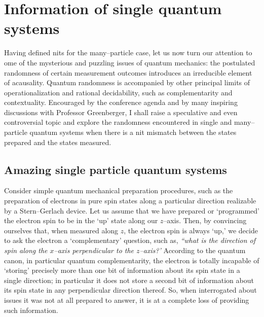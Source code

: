 \documentclass{article}
\begin{document}

\section{Information of single quantum systems}

Having defined nits for the many--particle case,
let us now turn our attention to ome of the
mysterious and puzzling issues of quantum mechanics:
the postulated randomness of certain measurement outcomes
introduces an irreducible element of acausality.
Quantum randomness is accompanied by other principal limits
of operationalization and rational decidability,
such as complementarity and contextuality.
Encouraged by the conference agenda and
by many inspiring discussions with Professor Greenberger,
I shall raise a speculative and even controversial topic and
explore the randomness encountered in single and many--particle quantum systems
when there is a nit mismatch
between the states prepared and the states measured.

\subsection{Amazing single particle quantum systems}

Consider simple quantum mechanical preparation procedures, such as
the preparation of electrons in pure spin states along a particular direction
realizable by a Stern--Gerlach device.
Let us assume that we have prepared or `programmed' the electron spin to be in the `up' state
along our $z$--axis.
Then, by convincing ourselves that, when measured along $z$, the electron spin is always `up,'
we decide to ask the electron a `complementary' question, such as,
{\em ``what is the direction of spin along the $x$--axis perpendicular
to the  $z$--axis?'}
According to the quantum canon, in particular quantum complementarity,
the electron is totally incapable of `storing' precisely more
than one bit of information about its spin state in a single direction;
in particular it does not store
a second bit of information about its spin state
in any perpendicular direction thereof.
So, when interrogated about issues it was not at all prepared to answer,
it is at a complete loss of providing such information.
\end{document}
